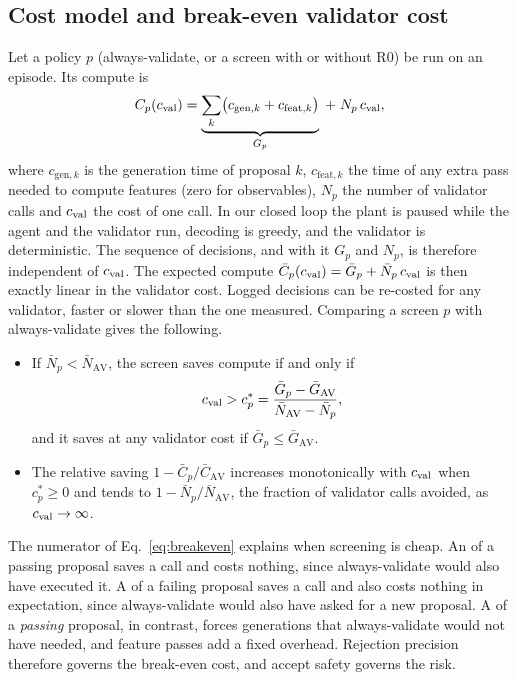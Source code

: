 \subsection{Cost model and break-even validator cost}\label{sec:costmodel}
Let a policy $p$ (always-validate, or a screen with or without R0) be run on an episode. Its compute is
\begin{equation}\label{eq:cost}
C_p(c_{\mathrm{val}})=\underbrace{\sum_{k}\bigl(c_{\mathrm{gen},k}+c_{\mathrm{feat},k}\bigr)}_{G_p}\;+\;N_p\,c_{\mathrm{val}},
\end{equation}
where $c_{\mathrm{gen},k}$ is the generation time of proposal $k$, $c_{\mathrm{feat},k}$ the time of any extra
pass needed to compute features (zero for observables), $N_p$ the number of validator calls and $c_{\mathrm{val}}$ the cost
of one call. In our closed loop the plant is paused while the agent and the validator run, decoding is greedy,
and the validator is deterministic. The sequence of decisions, and with it $G_p$ and $N_p$, is therefore
independent of $c_{\mathrm{val}}$. The expected compute $\bar C_p(c_{\mathrm{val}})=\bar G_p+\bar N_p\,c_{\mathrm{val}}$ is then exactly linear in
the validator cost. Logged decisions can be re-costed for any validator, faster or slower than the one
measured. Comparing a screen $p$ with always-validate gives the following.
\begin{itemize}
\item If $\bar N_p<\bar N_{\mathrm{AV}}$, the screen saves compute if and only if
\begin{equation}\label{eq:breakeven}
c_{\mathrm{val}}>c^{\ast}_p=\frac{\bar G_p-\bar G_{\mathrm{AV}}}{\bar N_{\mathrm{AV}}-\bar N_p},
\end{equation}
and it saves at any validator cost if $\bar G_p\le\bar G_{\mathrm{AV}}$.
\item The relative saving $1-\bar C_p/\bar C_{\mathrm{AV}}$ increases monotonically with $c_{\mathrm{val}}$ when
$c^{\ast}_p\ge0$ and tends to $1-\bar N_p/\bar N_{\mathrm{AV}}$, the fraction of validator calls avoided, as
$c_{\mathrm{val}}\to\infty$.
\end{itemize}
The numerator of Eq.~\eqref{eq:breakeven} explains when screening is cheap. An \ACC{} of a passing proposal
saves a call and costs nothing, since always-validate would also have executed it. A \REJ{} of a failing
proposal saves a call and also costs nothing in expectation, since always-validate would also have asked for a
new proposal. A \REJ{} of a \emph{passing} proposal, in contrast, forces generations that always-validate would
not have needed, and feature passes add a fixed overhead. Rejection precision therefore governs the break-even
cost, and accept safety governs the risk.


